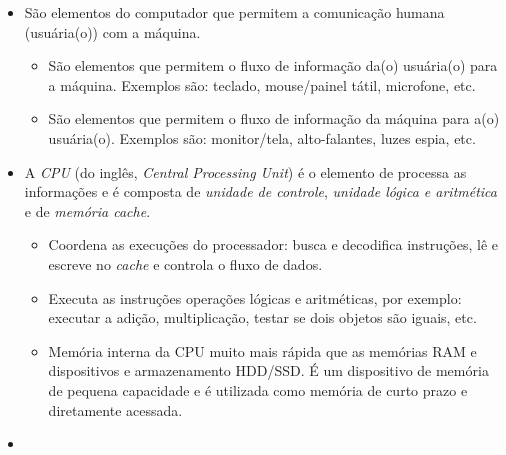 \begin{itemize}
\item {}

  São elementos do computador que permitem a comunicação humana (usuária(o)) com a máquina.

  \begin{itemize}
  \item {}

    São elementos que permitem o fluxo de informação da(o) usuária(o) para a máquina. Exemplos são: teclado, mouse/painel tátil, microfone, etc.

  \item {}

    São elementos que permitem o fluxo de informação da máquina para a(o) usuária(o). Exemplos são: monitor/tela, alto-falantes, luzes espia, etc.
  \end{itemize}

\item {}

  A \emph{CPU} (do inglês, \textit{Central Processing Unit}) é o elemento de processa as informações e é composta de \emph{unidade de controle}, \emph{unidade lógica e aritmética} e de \emph{memória cache}.

  \begin{itemize}
  \item {}

    Coordena as execuções do processador: busca e decodifica instruções, lê e escreve no \textit{cache} e controla o fluxo de dados.

  \item {}

    Executa as instruções operações lógicas e aritméticas, por exemplo: executar a adição, multiplicação, testar se dois objetos são iguais, etc.

  \item {}

    Memória interna da CPU muito mais rápida que as memórias RAM e dispositivos e armazenamento HDD/SSD. É um dispositivo de memória de pequena capacidade e é utilizada como memória de curto prazo e diretamente acessada.
  \end{itemize}

\item {}


\end{itemize}
